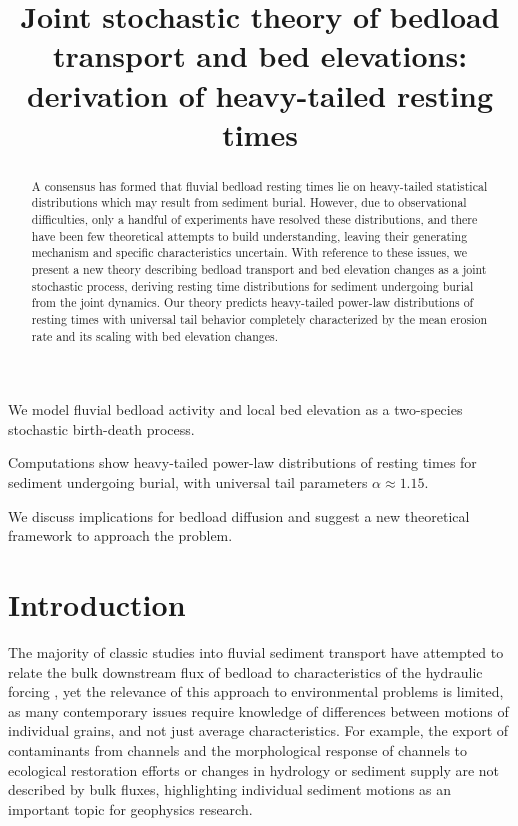 \documentclass[draft]{agujournal2018}
\begin{document}
\title{Joint stochastic theory of bedload transport and bed elevations: derivation of heavy-tailed resting times}

\begin{keypoints}
\item We model fluvial bedload activity and local bed elevation as a two-species stochastic birth-death process.
\item Computations show heavy-tailed power-law distributions of resting times for sediment undergoing burial, with universal tail parameters $\alpha\approx1.15$.
\item We discuss implications for bedload diffusion and suggest a new theoretical framework to approach the problem.

\end{keypoints}

\begin{abstract}
A consensus has formed that fluvial bedload resting times lie on heavy-tailed statistical distributions which may result from sediment burial.
However, due to observational difficulties, only a handful of experiments have resolved these distributions, and there have been few theoretical attempts to build understanding, leaving their generating mechanism and specific characteristics uncertain.
With reference to these issues, we present a new theory describing bedload transport and bed elevation changes as a joint stochastic process, deriving resting time distributions for sediment undergoing burial from the joint dynamics.
Our theory predicts heavy-tailed power-law distributions of resting times with universal tail behavior completely characterized by the mean erosion rate and its scaling with bed elevation changes.
\end{abstract} 

\section{Introduction}

The majority of classic studies into fluvial sediment transport have attempted to relate the bulk downstream flux of bedload to characteristics of the hydraulic forcing \citep[e.g.][]{Yalin1972}, yet the relevance of this approach to environmental problems is limited, as many contemporary issues require knowledge of differences between motions of individual grains, and not just average characteristics.
For example, the export of contaminants from channels \citep[e.g.][]{Malmon2005} and the morphological response of channels to ecological restoration efforts \citep[e.g.][]{Gaeuman2017} or changes in hydrology or sediment supply \citep[e.g.][]{Hassan2017} are not described by bulk fluxes, highlighting individual sediment motions as an important topic for geophysics research.
\end{document}

